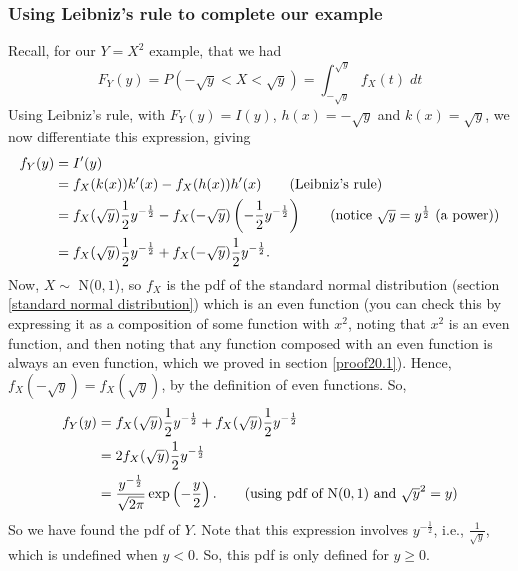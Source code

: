 \subsubsection{Using Leibniz's rule to complete our example}
Recall, for our $Y = X^2$ example, that we had
\[
F_Y(y) = P(-\sqrt{y} < X < \sqrt{y}) = \int_{-\sqrt{y}}^{\sqrt{y}} f_X(t) \; dt
\]
Using Leibniz's rule, with $F_Y(y) = I(y)$, $h(x) = -\sqrt{y}$ and $k(x) = \sqrt{y}$, we now differentiate this expression, giving
\begin{align*}
f_Y(y) & = I'(y) \\
	 & = f_X(k(x))k'(x) - f_X(h(x))h'(x) \tag{Leibniz's rule} \\
	 & = f_X(\sqrt{y})\frac{1}{2}y^{-\frac{1}{2}} - f_X(-\sqrt{y})\brac{-\frac{1}{2}y^{-\frac{1}{2}}} \tag{notice $\sqrt{y} = y^{\frac{1}{2}}$ (a power)} \\
	 & = f_X(\sqrt{y})\frac{1}{2}y^{-\frac{1}{2}} + f_X(-\sqrt{y})\frac{1}{2}y^{-\frac{1}{2}}.
\end{align*}
Now, $X \sim$ N($0,1$), so $f_X$ is the pdf of the standard normal distribution (section \ref{standard normal distribution}) which is an even function (you can check this by expressing it as a composition of some function with $x^2$, noting that $x^2$ is an even function, and then noting that any function composed with an even function is always an even function, which we proved in section \ref{proof20.1}). Hence, $f_X(-\sqrt{y}) = f_X(\sqrt{y})$, by the definition of even functions. So,
\begin{align*}
f_Y(y) & = f_X(\sqrt{y})\frac{1}{2}y^{-\frac{1}{2}} + f_X(\sqrt{y})\frac{1}{2}y^{-\frac{1}{2}} \\
	& = 2f_X(\sqrt{y})\frac{1}{2}y^{-\frac{1}{2}} \\
	& = \frac{y^{-\frac{1}{2}}}{\sqrt{2\pi}}\exp\brac{-\frac{y}{2}}. \tag{using pdf of N($0,1$) and $\sqrt{y}^2 = y$}
\end{align*}
So we have found the pdf of $Y$. Note that this expression involves $y^{-\frac{1}{2}}$, i.e., $\frac{1}{\sqrt{y}}$, which is undefined when $y < 0$. So, this pdf is only defined for $y \geq 0$. 